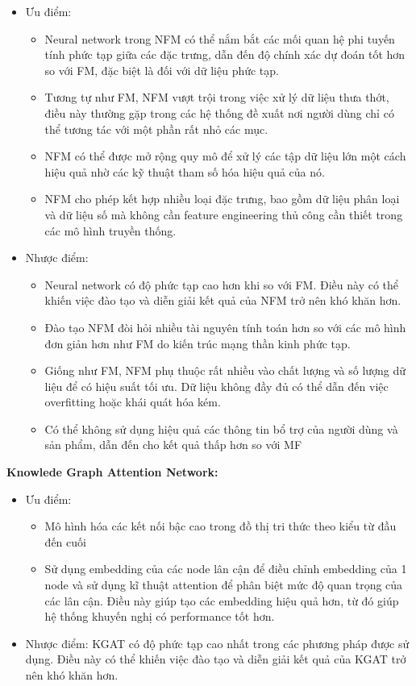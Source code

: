 \begin{itemize}
    \item Ưu điểm:
    \begin{itemize}
        \item Neural network trong NFM có thể nắm bắt các mối quan hệ phi tuyến tính phức tạp giữa các đặc trưng, dẫn đến độ chính xác dự đoán tốt hơn so với FM, đặc biệt là đối với dữ liệu phức tạp.
        \item Tương tự như FM, NFM vượt trội trong việc xử lý dữ liệu thưa thớt, điều này thường gặp trong các hệ thống đề xuất nơi người dùng chỉ có thể tương tác với một phần rất nhỏ các mục.
        \item NFM có thể được mở rộng quy mô để xử lý các tập dữ liệu lớn một cách hiệu quả nhờ các kỹ thuật tham số hóa hiệu quả của nó.
        \item NFM cho phép kết hợp nhiều loại đặc trưng, bao gồm dữ liệu phân loại và dữ liệu số mà không cần feature engineering thủ công cần thiết trong các mô hình truyền thống.
    \end{itemize}
    \item Nhược điểm:
    \begin{itemize}
        \item Neural network có độ phức tạp cao hơn khi so với FM. Điều này có thể khiến việc đào tạo và diễn giải kết quả của NFM trở nên khó khăn hơn.
        \item Đào tạo NFM đòi hỏi nhiều tài nguyên tính toán hơn so với các mô hình đơn giản hơn như FM do kiến trúc mạng thần kinh phức tạp.
        \item Giống như FM, NFM phụ thuộc rất nhiều vào chất lượng và số lượng dữ liệu để có hiệu suất tối ưu. Dữ liệu không đầy đủ có thể dẫn đến việc overfitting hoặc khái quát hóa kém.
        \item Có thể không sử dụng hiệu quả các thông tin bổ trợ của người dùng và sản phẩm, dẫn đến cho kết quả thấp hơn so với MF
    \end{itemize}
\end{itemize}
\textbf{Knowlede Graph Attention Network: }
\begin{itemize}
    \item Ưu điểm:
    \begin{itemize}
        \item Mô hình hóa các kết nối bậc cao trong đồ thị tri thức theo kiểu từ đầu đến cuối
        \item Sử dụng embedding của các node lân cận để điều chỉnh embedding của 1 node và sử dụng kĩ thuật attention để phân biệt mức độ quan trọng của các lân cận. Điều này giúp tạo các embedding hiệu quả hơn, từ đó giúp hệ thống khuyến nghị có performance tốt hơn.
    \end{itemize}
    \item Nhược điểm: KGAT có độ phức tạp cao nhất trong các phương pháp được sử dụng. Điều này có thể khiến việc đào tạo và diễn giải kết quả của KGAT trở nên khó khăn hơn.  
\end{itemize}
